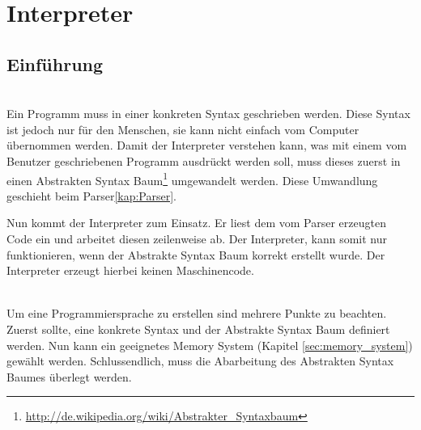 

\chapter{Interpreter}

\section{Einführung}




\\
Ein Programm muss in einer konkreten Syntax geschrieben werden. Diese Syntax ist jedoch nur für den Menschen, sie kann nicht einfach vom Computer übernommen werden. Damit der Interpreter verstehen kann, was mit einem vom Benutzer geschriebenen Programm ausdrückt werden soll, muss dieses zuerst in einen Abstrakten Syntax Baum\footnote{\url{http://de.wikipedia.org/wiki/Abstrakter_Syntaxbaum}} umgewandelt werden. Diese Umwandlung geschieht beim Parser\ref{kap:Parser}.

Nun kommt der Interpreter zum Einsatz. Er liest dem vom Parser erzeugten Code ein und arbeitet diesen zeilenweise ab. Der Interpreter, kann somit nur funktionieren, wenn der Abstrakte Syntax Baum korrekt erstellt wurde. Der Interpreter erzeugt hierbei keinen Maschinencode.

\\
Um eine Programmiersprache zu erstellen sind mehrere Punkte zu beachten. Zuerst sollte, eine konkrete Syntax und der Abstrakte Syntax Baum definiert werden. Nun kann ein geeignetes Memory System (Kapitel \ref{sec:memory_system}) gewählt werden. Schlussendlich, muss die Abarbeitung des Abstrakten Syntax Baumes überlegt werden.


